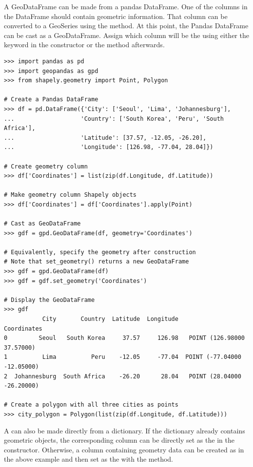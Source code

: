 A GeoDataFrame can be made from a pandas DataFrame.
One of the columns in the DataFrame should contain geometric information.
That column can be converted to a GeoSeries using the  method.
At this point, the Pandas DataFrame can be cast as a GeoDataFrame.
Assign which column will be the  using either the  keyword in the constructor or the  method afterwards.

\begin{lstlisting}
>>> import pandas as pd
>>> import geopandas as gpd
>>> from shapely.geometry import Point, Polygon

# Create a Pandas DataFrame
>>> df = pd.DataFrame({'City': ['Seoul', 'Lima', 'Johannesburg'],
...                   'Country': ['South Korea', 'Peru', 'South Africa'],
...                   'Latitude': [37.57, -12.05, -26.20],
...                   'Longitude': [126.98, -77.04, 28.04]})

# Create geometry column
>>> df['Coordinates'] = list(zip(df.Longitude, df.Latitude))

# Make geometry column Shapely objects
>>> df['Coordinates'] = df['Coordinates'].apply(Point)

# Cast as GeoDataFrame
>>> gdf = gpd.GeoDataFrame(df, geometry='Coordinates')

# Equivalently, specify the geometry after construction
# Note that set_geometry() returns a new GeoDataFrame
>>> gdf = gpd.GeoDataFrame(df)
>>> gdf = gdf.set_geometry('Coordinates')

# Display the GeoDataFrame
>>> gdf
           City       Country  Latitude  Longitude                  Coordinates
0         Seoul   South Korea     37.57     126.98   POINT (126.98000 37.57000)
1          Lima          Peru    -12.05     -77.04  POINT (-77.04000 -12.05000)
2  Johannesburg  South Africa    -26.20      28.04   POINT (28.04000 -26.20000)

# Create a polygon with all three cities as points
>>> city_polygon = Polygon(list(zip(df.Longitude, df.Latitude)))
\end{lstlisting}

A  can also be made directly from a dictionary.
If the dictionary already contains geometric objects, the corresponding column can be directly set as the  in the constructor.
Otherwise, a column containing geometry data can be created as in the above example and then set as the  with the  method.

